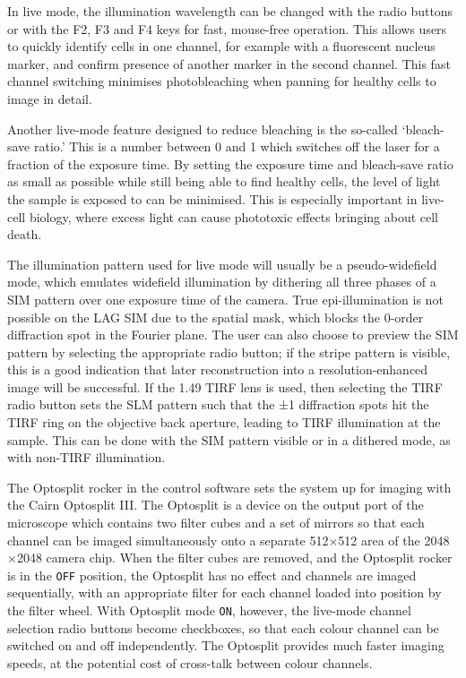 In live mode, the illumination wavelength can be changed with the radio buttons or with the F2, F3 and F4 keys for fast, mouse-free operation. 
This allows users to quickly identify cells in one channel, for example with a fluorescent nucleus marker, and confirm presence of another marker in the second channel.
This fast channel switching minimises photobleaching when panning for healthy cells to image in detail. 

Another live-mode feature designed to reduce bleaching is the so-called `bleach-save ratio.' 
This is a number between 0 and 1 which switches off the laser for a fraction of the exposure time. 
By setting the exposure time and bleach-save ratio as small as possible while still being able to find healthy cells, the level of light the sample is exposed to can be minimised.
This is especially important in live-cell biology, where excess light can cause phototoxic effects bringing about cell death. 

The illumination pattern used for live mode will usually be a pseudo-widefield mode, which emulates widefield illumination by dithering all three phases of a SIM pattern over one exposure time of the camera. 
True epi-illumination is not possible on the LAG SIM due to the spatial mask, which blocks the 0-order diffraction spot in the Fourier plane. 
The user can also choose to preview the SIM pattern by selecting the appropriate radio button; if the stripe pattern is visible, this is a good indication that later reconstruction into a resolution-enhanced image will be successful. 
If the \SI{1.49}{\numaperture} TIRF lens is used, then selecting the TIRF radio button sets the SLM pattern such that the ±1 diffraction spots hit the TIRF ring on the objective back aperture, leading to TIRF illumination at the sample. 
This can be done with the SIM pattern visible or in a dithered mode, as with non-TIRF illumination. 

The Optosplit rocker in the control software sets the system up for imaging with the Cairn Optosplit III. 
The Optosplit is a device on the output port of the microscope which contains two filter cubes and a set of mirrors so that each channel can be imaged simultaneously onto a separate 512$\times$512 area of the 2048$\times$2048 camera chip.
When the filter cubes are removed, and the Optosplit rocker is in the \texttt{OFF} position, the Optosplit has no effect and channels are imaged sequentially, with an appropriate filter for each channel loaded into position by the filter wheel. 
With Optosplit mode \texttt{ON}, however, the live-mode channel selection radio buttons become checkboxes, so that each colour channel can be switched on and off independently. 
The Optosplit provides much faster imaging speeds, at the potential cost of cross-talk between colour channels. 

